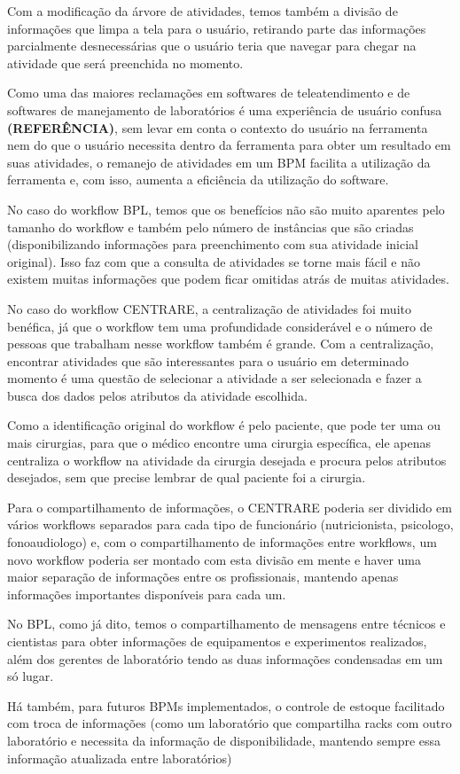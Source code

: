 Com a modificação da árvore de atividades, temos também a divisão de informações que limpa a tela para o usuário, retirando parte das informações parcialmente desnecessárias que o usuário teria que navegar para chegar na atividade que será preenchida no momento.

Como uma das maiores reclamações em softwares de teleatendimento e de softwares de manejamento de laboratórios é uma experiência de usuário confusa \textbf{(REFERÊNCIA)}, sem levar em conta o contexto do usuário na ferramenta nem do que o usuário necessita dentro da ferramenta para obter um resultado em suas atividades, o remanejo de atividades em um BPM facilita a utilização da ferramenta e, com isso, aumenta a eficiência da utilização do software.

No caso do workflow BPL, temos que os benefícios não são muito aparentes pelo tamanho do workflow e também pelo número de instâncias que são criadas (disponibilizando informações para preenchimento com sua atividade inicial original). Isso faz com que a consulta de atividades se torne mais fácil e não existem muitas informações que podem ficar omitidas atrás de muitas atividades.

No caso do workflow CENTRARE, a centralização de atividades foi muito benéfica, já que o workflow tem uma profundidade considerável e o número de pessoas que trabalham nesse workflow também é grande. Com a centralização, encontrar atividades que são interessantes para o usuário em determinado momento é uma questão de selecionar a atividade a ser selecionada e fazer a busca dos dados pelos atributos da atividade escolhida.

Como a identificação original do workflow é pelo paciente, que pode ter uma ou mais cirurgias, para que o médico encontre uma cirurgia específica, ele apenas centraliza o workflow na atividade da cirurgia desejada e procura pelos atributos desejados, sem que precise lembrar de qual paciente foi a cirurgia.

Para o compartilhamento de informações, o CENTRARE poderia ser dividido em vários workflows separados para cada tipo de funcionário (nutricionista, psicologo, fonoaudiologo) e, com o compartilhamento de informações entre workflows, um novo workflow poderia ser montado com esta divisão em mente e haver uma maior separação de informações entre os profissionais, mantendo apenas informações importantes disponíveis para cada um.

No BPL, como já dito, temos o compartilhamento de mensagens entre técnicos e cientistas para obter informações de equipamentos e experimentos realizados, além dos gerentes de laboratório tendo as duas informações condensadas em um só lugar.

Há também, para futuros BPMs implementados, o controle de estoque facilitado com troca de informações (como um laboratório que compartilha racks com outro laboratório e necessita da informação de disponibilidade, mantendo sempre essa informação atualizada entre laboratórios)